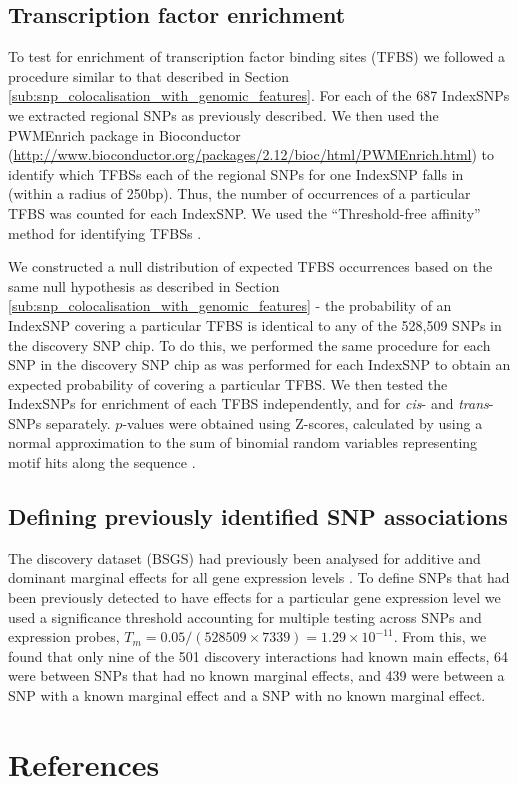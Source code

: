 \documentclass{article}
\begin{document}
\subsection{Transcription factor enrichment}

To test for enrichment of transcription factor binding sites (TFBS) we followed a procedure similar to that described in Section \ref{sub:snp_colocalisation_with_genomic_features}. For each of the 687 IndexSNPs we extracted regional SNPs as previously described. We then used the PWMEnrich package in Bioconductor (\url{http://www.bioconductor.org/packages/2.12/bioc/html/PWMEnrich.html}) to identify which TFBSs each of the regional SNPs for one IndexSNP falls in (within a radius of 250bp). Thus, the number of occurrences of a particular TFBS was counted for each IndexSNP. We used the ``Threshold-free affinity'' method for identifying TFBSs \cite{Stormo2000}.

We constructed a null distribution of expected TFBS occurrences based on the same null hypothesis as described in Section \ref{sub:snp_colocalisation_with_genomic_features} - the probability of an IndexSNP covering a particular TFBS is identical to any of the 528,509 SNPs in the discovery SNP chip. To do this, we performed the same procedure for each SNP in the discovery SNP chip as was performed for each IndexSNP to obtain an expected probability of covering a particular TFBS. We then tested the IndexSNPs for enrichment of each TFBS independently, and for \emph{cis}- and \emph{trans}-SNPs separately. $p$-values were obtained using Z-scores, calculated by using a normal approximation to the sum of binomial random variables representing motif hits along the sequence \cite{HoSui2005}.


\subsection{Defining previously identified SNP associations}

The discovery dataset (BSGS) had previously been analysed for additive and dominant marginal effects for all gene expression levels \cite{Powell2012, Powell2013}. To define SNPs that had been previously detected to have effects for a particular gene expression level we used a significance threshold accounting for multiple testing across SNPs and expression probes, $T_{m} = 0.05 / (528509 \times 7339) = 1.29 \times 10^{-11}$. From this, we found that only nine of the 501 discovery interactions had known main effects, 64 were between SNPs that had no known marginal effects, and 439 were between a SNP with a known marginal effect and a SNP with no known marginal effect.



\section{References}

\end{document}
